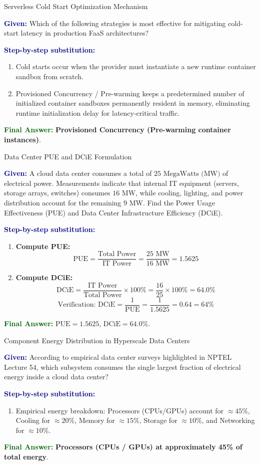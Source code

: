 \documentclass[11pt,a4paper,openany]{report}
\newcommand{\Given}{\par\textbf{\textcolor{navy}{Given:}} }
\newcommand{\Steps}{\par\textbf{\textcolor{navy}{Step-by-step substitution:}}\par}
\newcommand{\Answer}{\par\textbf{\textcolor{darkgreen}{Final Answer:}} }
\begin{document}
\begin{solved}{Serverless Cold Start Optimization Mechanism}
\Given Which of the following strategies is most effective for mitigating cold-start latency in production FaaS architectures?
\Steps
\begin{enumerate}[leftmargin=*]
  \item Cold starts occur when the provider must instantiate a new runtime container sandbox from scratch.
  \item Provisioned Concurrency / Pre-warming keeps a predetermined number of initialized container sandboxes permanently resident in memory, eliminating runtime initialization delay for latency-critical traffic.
\end{enumerate}
\Answer \textbf{Provisioned Concurrency (Pre-warming container instances)}.
\end{solved}

\begin{solved}{Data Center PUE and DCiE Formulation}
\Given A cloud data center consumes a total of $25\text{ MegaWatts (MW)}$ of electrical power. Measurements indicate that internal IT equipment (servers, storage arrays, switches) consumes $16\text{ MW}$, while cooling, lighting, and power distribution account for the remaining $9\text{ MW}$. Find the Power Usage Effectiveness (PUE) and Data Center Infrastructure Efficiency (DCiE).
\Steps
\begin{enumerate}[leftmargin=*]
  \item \textbf{Compute PUE:}
  \begin{equation}
  \text{PUE} = \frac{\text{Total Power}}{\text{IT Power}} = \frac{25\text{ MW}}{16\text{ MW}} = 1.5625
  \end{equation}
  \item \textbf{Compute DCiE:}
  \begin{equation}
  \text{DCiE} = \frac{\text{IT Power}}{\text{Total Power}} \times 100\% = \frac{16}{25} \times 100\% = 64.0\%
  \end{equation}
  \begin{equation}
  \text{Verification: } \text{DCiE} = \frac{1}{\text{PUE}} = \frac{1}{1.5625} = 0.64 = 64\%
  \end{equation}
\end{enumerate}
\Answer \textbf{$\text{PUE} = 1.5625$}, \textbf{$\text{DCiE} = 64.0\%$}.
\end{solved}

\begin{solved}{Component Energy Distribution in Hyperscale Data Centers}
\Given According to empirical data center surveys highlighted in NPTEL Lecture 54, which subsystem consumes the single largest fraction of electrical energy inside a cloud data center?
\Steps
\begin{enumerate}[leftmargin=*]
  \item Empirical energy breakdown: Processors (CPUs/GPUs) account for $\approx 45\%$, Cooling for $\approx 20\%$, Memory for $\approx 15\%$, Storage for $\approx 10\%$, and Networking for $\approx 10\%$.
\end{enumerate}
\Answer \textbf{Processors (CPUs / GPUs) at approximately 45\% of total energy}.
\end{solved}
\end{document}
